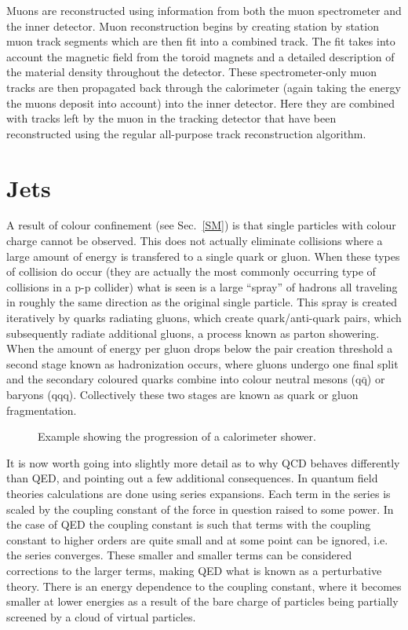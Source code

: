 Muons are reconstructed using information from both the muon spectrometer and the inner detector.  
Muon reconstruction begins by creating station by station muon track segments which are then fit into a combined track.  
The fit takes into account the magnetic field from the toroid magnets and a detailed description of the material density throughout the detector.  
These spectrometer-only muon tracks are then propagated back through the calorimeter (again taking the energy the muons deposit into account) into the inner detector.  
Here they are combined with tracks left by the muon in the tracking detector that have been reconstructed using the regular all-purpose track reconstruction algorithm.  

\section{Jets}
\label{jets}

A result of colour confinement (see Sec.~\ref{SM}) is that single particles with colour charge cannot be observed.  
This does not actually eliminate collisions where a large amount of energy is transfered to a single quark or gluon.  
When these types of collision do occur (they are actually the most commonly occurring type of collisions in a p-p collider) what is seen is a large ``spray'' of hadrons all traveling in roughly the same direction as the original single particle.  
This spray is created iteratively by quarks radiating gluons, which create quark/anti-quark pairs, which subsequently radiate additional gluons, a process known as parton showering.  
When the amount of energy per gluon drops below the pair creation threshold a second stage known as hadronization occurs, where gluons undergo one final split and the secondary coloured quarks combine into colour neutral mesons (q$\bar{\mathrm q}$) or baryons (qqq).    
Collectively these two stages are known as quark or gluon fragmentation.  

\begin{figure}[!ht]
  \begin{center}
  \end{center}
  \caption[Parton showering diagram]
  {\small Example showing the progression of a calorimeter shower.  }
\end{figure}

It is now worth going into slightly more detail as to why QCD behaves differently than QED, and pointing out a few additional consequences.  
In quantum field theories calculations are done using series expansions.  
Each term in the series is scaled by the coupling constant of the force in question raised to some power.  
In the case of QED the coupling constant is such that terms with the coupling constant to higher orders are quite small and at some point can be ignored, i.e. the series converges.  
These smaller and smaller terms can be considered corrections to the larger terms, making QED what is known as a perturbative theory.  
There is an energy dependence to the coupling constant, where it becomes smaller at lower energies as a result of the bare charge of particles being partially screened by a cloud of virtual particles.  

